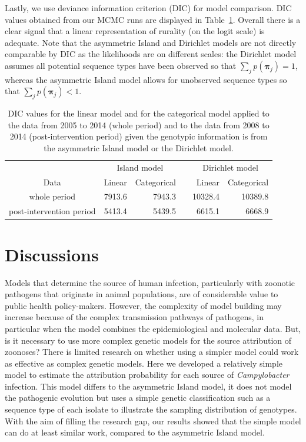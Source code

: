 \documentclass[times, doublespace]{simauth}%
\begin{document}
Lastly, we use deviance information criterion (DIC) for model comparison. DIC values obtained from our MCMC runs are displayed in Table~\ref{tab3}. Overall there is a clear signal that a linear representation of rurality (on the logit scale) is adequate. Note that the asymmetric Island and Dirichlet models are not directly comparable by DIC as the likelihoods are on different scales: the Dirichlet model assumes all potential sequence types have been observed so that $\sum_j p(\boldsymbol{\pi}_j) = 1$, whereas the asymmetric Island model allows for unobserved sequence types so that $\sum_j p(\boldsymbol{\pi}_j) < 1$.

\begin{table}
  \begin{center}
    \begin{tabular}{crrrrr}
      \toprule
      & \multicolumn{2}{c}{Island model}  & \multicolumn{1}{c}{} & \multicolumn{2}{c}{Dirichlet model} \\
      Data & Linear & Categorical & & Linear & Categorical\\ \midrule
      whole period  & 7913.6 & 7943.3  & & 10328.4  & 10389.8 \\
      post-intervention period  & 5413.4  & 5439.5  & & 6615.1   & 6668.9 \\
      \bottomrule
    \end{tabular}
  \end{center}
  \caption{DIC values for the linear model and for the categorical model applied to the data from 2005 to 2014 (whole period) and to the data from 2008 to 2014 (post-intervention period) given the genotypic information is from the asymmetric Island model or the Dirichlet model.}
  \label{tab3}
\end{table}

\section{Discussions}
Models that determine the source of human infection, particularly with zoonotic pathogens that originate in animal populations, are of considerable value to public health policy-makers. However, the complexity of model building may increase because of the complex transmission pathways of pathogens, in particular when the model combines the epidemiological and molecular data. But, is it necessary to use more complex genetic models for the source attribution of zoonoses? There is limited research on whether using a simpler model could work as effective as complex genetic models. Here we developed a relatively simple model to estimate the attribution probability for each source of \textit{Campylobacter} infection. This model differs to the asymmetric Island model, it does not model the pathogenic evolution but uses a simple genetic classification such as a sequence type of each isolate to illustrate the sampling distribution of genotypes. With the aim of filling the research gap, our results showed that the simple model can do at least similar work, compared to the asymmetric Island model.
\end{document}
